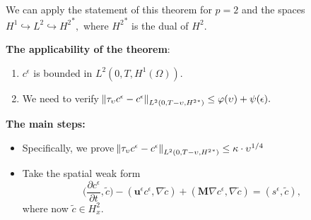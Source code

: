 \documentclass{beamer}
\begin{document}
\begin{frame}

We can apply the statement of this theorem for $p=2$ and the spaces $H^1 \hookrightarrow L^2 \hookrightarrow {H^2}^*,$ where ${H^2}^*$ is the dual of ${H^2}$.

\textbf{The applicability of the theorem}:
\begin{enumerate}
  \item $c^\epsilon$ is bounded in $L^2(0,T, H^1(\Omega)).$
  \item We need to verify $\norm{\tau_\upsilon c^\epsilon - c^\epsilon}_{L^2(0,T-\upsilon, {H^2}^*)} \leq \varphi(\upsilon) + \psi(\epsilon).$
\end{enumerate}

\textbf{The main steps:}

\begin{itemize}
  \item Specifically, we prove $\norm{\tau_\upsilon c^\epsilon - c^\epsilon}_{L^2(0,T-\upsilon, {H^2}^*)} \leq \kappa \cdot \upsilon^{1/4}$
  \item Take the spatial weak form \begin{equation} \nonumber \bigg (\frac{\partial c^\epsilon}{\partial t}, \tilde{c} \bigg ) - (\mathbf{u}^\epsilon c^\epsilon, \nabla \tilde{c}) + (\mathbf{M} \nabla c^\epsilon, \nabla \tilde{c}) = (s^\epsilon, \tilde{c}), \end{equation} where now $\tilde{c} \in H^2_x.$
\end{itemize}

\end{frame}
\end{document}
